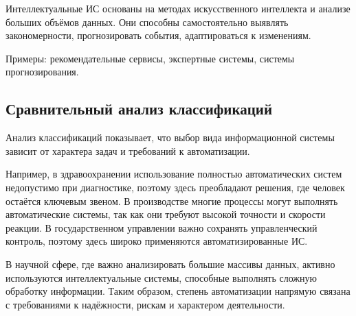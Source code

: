 \documentclass{ou}
\begin{document}
Интеллектуальные ИС основаны на методах искусственного интеллекта и анализе больших объёмов данных. Они способны самостоятельно выявлять закономерности, прогнозировать события, адаптироваться к изменениям.

Примеры: рекомендательные сервисы, экспертные системы, системы прогнозирования.
\subsection{Сравнительный анализ классификаций}
Анализ классификаций показывает, что выбор вида информационной системы зависит от характера задач и требований к автоматизации.

Например, в здравоохранении использование полностью автоматических систем недопустимо при диагностике, поэтому здесь преобладают решения, где человек остаётся ключевым звеном. В производстве многие процессы могут выполнять автоматические системы, так как они требуют высокой точности и скорости реакции. В государственном управлении важно сохранять управленческий контроль, поэтому здесь широко применяются автоматизированные ИС.

В научной сфере, где важно анализировать большие массивы данных, активно используются интеллектуальные системы, способные выполнять сложную обработку информации. Таким образом, степень автоматизации напрямую связана с требованиями к надёжности, рискам и характером деятельности.
\section{}
\newpage
{
\sloppy
\nocite{*}


}
\end{document}
